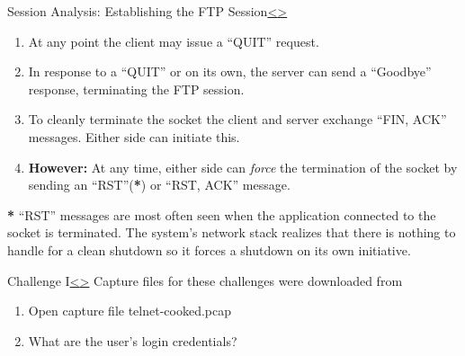 \documentclass[12pt]{extarticle}
\newenvironment{instructionblock}{\Large\bgroup}{\egroup}
\begin{document}
\pagebreak
\begin{slide}{Session Analysis: Establishing the FTP Session}{\hyperref[slide 21]{\textless}\hyperref[slide 23]{\textgreater}}
\begin{instructionblock}
\begin{enumerate}
\item At any point the client may issue a ``QUIT'' request.
\item In response to a ``QUIT'' or on its own, the server can send a ``Goodbye'' response, terminating the FTP session.
\item To cleanly terminate the socket the client and server exchange ``FIN, ACK'' messages.  Either side can initiate this.
\item \textbf{However:} At any time, either side can \textit{force} the termination of the socket by sending an ``RST''(\textbf{*}) or ``RST, ACK'' message.
\end{enumerate}
\end{instructionblock}
\end{slide}

\vspace{4mm}
\noindent
{\textbf{*}} ``RST'' messages are most often seen when the application connected to the socket is terminated.  The system's network stack realizes that there is nothing to handle for a clean shutdown so it forces a shutdown on its own initiative.




\pagebreak
\begin{slide}{Challenge I}{\hyperref[slide 22]{\textless}\hyperref[slide 24]{\textgreater}}
\vskip 5pt
\begin{instructionblock}
Capture files for these challenges were downloaded from \cite{sampleCaps}
\begin{enumerate}
\item Open capture file telnet-cooked.pcap
\item What are the user's login credentials?
\end{enumerate}
\end{instructionblock}
\end{slide}
\end{document}
